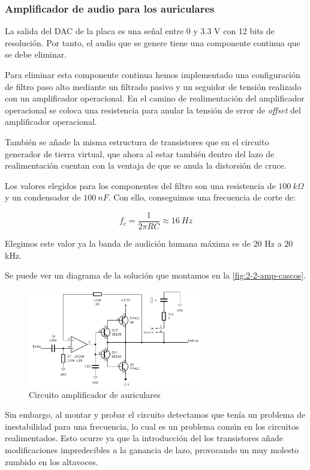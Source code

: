 \subsubsection{Amplificador de audio para los auriculares}

La salida del DAC de la placa es una señal entre 0 y 3.3 V con 12 bits de resolución. Por tanto, el audio que se genere tiene una componente continua que se debe eliminar. 

Para eliminar esta componente continua hemos implementado una configuración de filtro paso alto mediante un filtrado pasivo y un seguidor de tensión realizado con un amplificador operacional. En el camino de realimentación del amplificador operacional se coloca una resistencia para anular la tensión de error de \textit{offset} del amplificador operacional.

También se añade la misma estructura de transistores que en el circuito generador de tierra virtual, que ahora al estar también dentro del lazo de realimentación cuentan con la ventaja de que se anula la distorsión de cruce. 

Los valores elegidos para los componentes del filtro son una resistencia de $100\ k\Omega$ y un condensador de $100\ nF$. Con ello, conseguimos una frecuencia de corte de:

\[
    f_c = \frac{1}{2\pi RC} \approx 16\ Hz    
\]

Elegimos este valor ya la banda de audición humana máxima es de $20$ Hz a $20$ kHz.

Se puede ver un diagrama de la solución que montamos en la \autoref{fig:2-2-amp-cascos}.

\begin{figure}[h]
    \centering
    \includegraphics[width=0.7\textwidth]{images/2/2-2/circuitoAmplificadorCascos.png}
    \caption{Circuito amplificador de auriculares}
    \label{fig:2-2-amp-cascos}
\end{figure}

Sin embargo, al montar y probar el circuito detectamos que tenía un problema de inestabilidad para una frecuencia, lo cual es un problema común en los circuitos realimentados. Esto ocurre ya que la introducción del los transistores añade modificaciones impredecibles a la ganancia de lazo, provocando un muy molesto zumbido en los altavoces.

